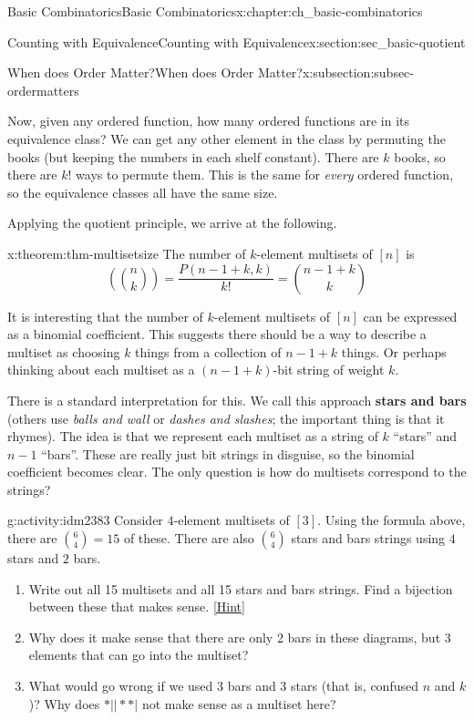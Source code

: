 \documentclass[oneside,10pt,]{book}
\newcommand{\terminology}[1]{\textbf{#1}}
\numberwithin{equation}{chapter}
\newcommand{\mchoose}[2]{\left(\!\binom{#1}{#2}\!\right)}
\begin{document}
\begin{chapterptx}{Basic Combinatorics}{}{Basic Combinatorics}{}{}{x:chapter:ch_basic-combinatorics}
\begin{sectionptx}{Counting with Equivalence}{}{Counting with Equivalence}{}{}{x:section:sec_basic-quotient}
\begin{subsectionptx}{When does Order Matter?}{}{When does Order Matter?}{}{}{x:subsection:subsec-ordermatters}
\par
Now, given any ordered function, how many ordered functions are in its equivalence class?  We can get any other element in the class by permuting the books (but keeping the numbers in each shelf constant).  There are \(k\) books, so there are \(k!\) ways to permute them.  This is the same for \emph{every} ordered function, so the equivalence classes all have the same size.%
\par
Applying the quotient principle, we arrive at the following.%
\begin{theorem}{}{}{x:theorem:thm-multisetsize}%
The number of \(k\)-element multisets of \([n]\) is%
\begin{equation*}
\mchoose{n}{k} = \frac{P(n-1+k, k)}{k!} = \binom{n-1+k}{k}
\end{equation*}
%
\end{theorem}
It is interesting that the number of \(k\)-element multisets of \([n]\) can be expressed as a binomial coefficient.  This suggests there should be a way to describe a multiset as choosing \(k\) things from a collection of \(n-1+k\) things. Or perhaps thinking about each multiset as a \((n-1+k)\)-bit string of weight \(k\).%
\par
There is a standard interpretation for this.  We call this approach \terminology{stars and bars} (others use \emph{balls and wall} or \emph{dashes and slashes}; the important thing is that it rhymes).  The idea is that we represent each multiset as a string of \(k\) ``stars'' and \(n-1\) ``bars''.  These are really just bit strings in disguise, so the binomial coefficient becomes clear.  The only question is how do multisets correspond to the strings?%
\begin{activity}{}{g:activity:idm2383}%
Consider \(4\)-element multisets of \([3]\).  Using the formula above, there are \(\binom{6}{4} = 15\) of these.  There are also \(\binom{6}{4}\) stars and bars strings using \(4\) stars and \(2\) bars.%
\begin{enumerate}[font=\bfseries,label=(\alph*),ref=\alph*]
\item{}Write out all 15 multisets and all 15 stars and bars strings.  Find a bijection between these that makes sense.%
\space\hspace*{0pt}\hfill{\tiny\hyperlink{g:hint:idm2395-back}{[Hint]}}\item{}Why does it make sense that there are only 2 bars in these diagrams, but 3 elements that can go into the multiset?%
\item{}What would go wrong if we used 3 bars and 3 stars (that is, confused \(n\) and \(k\))?  Why does \(*||**|\) not make sense as a multiset here?%

\end{enumerate}
\end{activity}
\end{subsectionptx}
\end{sectionptx}
\end{chapterptx}
\end{document}
